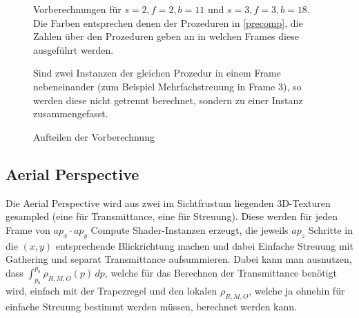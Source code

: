 \begin{figure}[H]

	Vorberechnungen für $s=2, f=2, b=11$ und $s=3, f=3, b=18$. Die Farben entsprechen denen der Prozeduren in
	\cref{precomp}, die Zahlen über den Prozeduren geben an in welchen Frames diese ausgeführt werden.

	Sind zwei Instanzen der gleichen Prozedur in einem Frame nebeneinander (zum Beispiel Mehrfachstreuung in Frame 3),
	so werden diese nicht getrennt berechnet, sondern zu einer Instanz zusammengefasst.
	\caption{Aufteilen der Vorberechnung}
	\label{precomputer}
\end{figure}

\subsection{Aerial Perspective}

Die Aerial Perspective wird aus zwei im Sichtfrustum liegenden 3D-Texturen gesampled (eine für Transmittance, eine für
Streuung). Diese werden für jeden Frame von $ap_x \cdot ap_y$ Compute Shader-Instanzen erzeugt, die jeweils $ap_z$
Schritte in die $(x,y)$ entsprechende Blickrichtung machen und dabei Einfache Streuung mit Gathering und separat
Transmittance aufsummieren. Dabei kann man ausnutzen, dass $\int_{p_a}^{p_b} \rho_{R,M,O}(p) \,dp$, welche für das
Berechnen der Transmittance benötigt wird, einfach mit der Trapezregel und den lokalen $\rho_{R,M,O}$, welche ja ohnehin
für einfache Streuung bestimmt werden müssen, berechnet werden kann.

